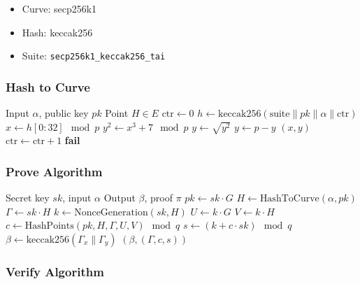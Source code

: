 \documentclass[11pt,a4paper]{article}
\theoremstyle{definition}
\begin{document}
\begin{itemize}
    \item Curve: secp256k1
    \item Hash: keccak256
    \item Suite: \texttt{secp256k1\_keccak256\_tai}
\end{itemize}

\subsubsection{Hash to Curve}

\begin{algorithm}
\caption{HashToCurve (Try-and-Increment)}
\begin{algorithmic}[1]
\Require Input $\alpha$, public key $pk$
\Ensure Point $H \in E$
\State $\text{ctr} \gets 0$
    \State $h \gets \text{keccak256}(\text{suite} \| pk \| \alpha \| \text{ctr})$
    \State $x \gets h[0:32] \mod p$
    \State $y^2 \gets x^3 + 7 \mod p$
        \State $y \gets \sqrt{y^2}$
            \State $y \gets p - y$
        \EndIf
        \Return $(x, y)$
    \EndIf
    \State $\text{ctr} \gets \text{ctr} + 1$
\EndWhile
\State \textbf{fail}
\end{algorithmic}
\end{algorithm}

\subsubsection{Prove Algorithm}

\begin{algorithm}
\caption{ECVRF Prove}
\begin{algorithmic}[1]
\Require Secret key $sk$, input $\alpha$
\Ensure Output $\beta$, proof $\pi$
\State $pk \gets sk \cdot G$
\State $H \gets \text{HashToCurve}(\alpha, pk)$
\State $\Gamma \gets sk \cdot H$
\State $k \gets \text{NonceGeneration}(sk, H)$
\State $U \gets k \cdot G$
\State $V \gets k \cdot H$
\State $c \gets \text{HashPoints}(pk, H, \Gamma, U, V) \mod q$
\State $s \gets (k + c \cdot sk) \mod q$
\State $\beta \gets \text{keccak256}(\Gamma_x \| \Gamma_y)$
\Return $(\beta, (\Gamma, c, s))$
\end{algorithmic}
\end{algorithm}

\subsubsection{Verify Algorithm}
\end{document}

